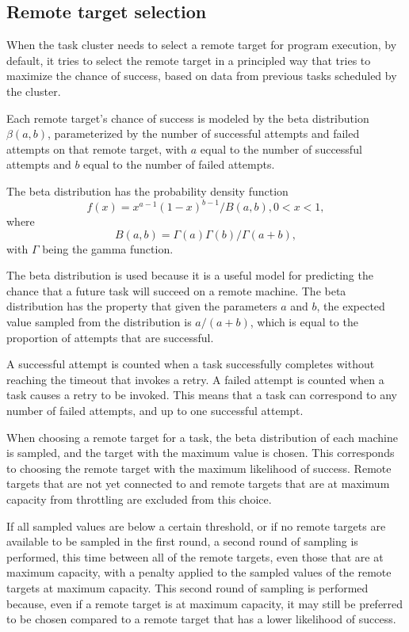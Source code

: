 \documentclass[twoside]{report}
\newcommand{\todoi}[1]{\todo[inline, color=blue!20]{TODO: {#1}}}
\begin{document}
\subsection{Remote target selection}
When the task cluster needs to select a remote target for program execution, by default, it tries to select the remote target in a principled way that tries to maximize the chance of success, based on data from previous tasks scheduled by the cluster.

Each remote target's chance of success is modeled by the beta distribution $\beta(a, b)$, parameterized by the number of successful attempts and failed attempts on that remote target, with $a$ equal to the number of successful attempts and $b$ equal to the number of failed attempts.

The beta distribution has the probability density function
$$ f(x) = x^{a-1}(1-x)^{b-1} / B(a, b), 0 < x < 1,$$
where
$$ B(a, b) = \Gamma(a)\Gamma(b) / \Gamma(a+b), $$
with $\Gamma$ being the gamma function.

The beta distribution is used because it is a useful model for predicting the chance that a future task will succeed on a remote machine.
The beta distribution has the property that given the parameters $a$ and $b$, the expected value sampled from the distribution is $a/(a+b)$, which is equal to the proportion of attempts that are successful.

A successful attempt is counted when a task successfully completes without reaching the timeout that invokes a retry.
A failed attempt is counted when a task causes a retry to be invoked.
This means that a task can correspond to any number of failed attempts, and up to one successful attempt.

When choosing a remote target for a task, the beta distribution of each machine is sampled, and the target with the maximum value is chosen.
This corresponds to choosing the remote target with the maximum likelihood of success.
Remote targets that are not yet connected to and remote targets that are at maximum capacity from throttling are excluded from this choice.

If all sampled values are below a certain threshold, or if no remote targets are available to be sampled in the first round, a second round of sampling is performed, this time between all of the remote targets, even those that are at maximum capacity, with a penalty applied to the sampled values of the remote targets at maximum capacity.
This second round of sampling is performed because, even if a remote target is at maximum capacity, it may still be preferred to be chosen compared to a remote target that has a lower likelihood of success.
\end{document}
